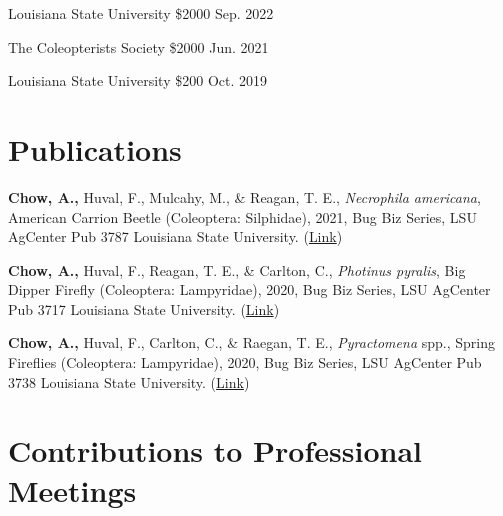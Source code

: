 \documentclass{article}
\newcommand{\hindent}{\hangindent=10pt}
\begin{document}
{Louisiana State University}
{\$2000} 
{Sep. 2022} %

{The Coleopterists Society}
{\$2000} 
{Jun. 2021} %

{Louisiana State University} 
{\$200}
{Oct. 2019} %

\section{Publications}
\newcommand{\BugBiz}[5]{
    \noindent
    \hindent
    {#1} %
    {#2}, %
    {#3}, %
    Bug Biz Series, LSU AgCenter Pub 
    {#4}
    Louisiana State University.
    (\href{#5}{Link}) %
}

\BugBiz{\textbf{\textbf{Chow, A.,}} Huval, F., Mulcahy, M., \& Reagan, T. E.,}
{\textit{Necrophila americana}, American Carrion Beetle (Coleoptera: Silphidae)}
{2021}
{3787}
{https://www.lsuagcenter.com/articles/page1619566292701}

\BugBiz{\textbf{\textbf{Chow, A.,}} Huval, F., Reagan, T. E., \& Carlton, C.,}
{\textit{Photinus pyralis}, Big Dipper Firefly (Coleoptera: Lampyridae)}
{2020}
{3717}
{https://www.lsuagcenter.com/profiles/bneely/articles/page1587050468972}

\BugBiz{\textbf{\textbf{Chow, A.,}} Huval, F., Carlton, C., \& Raegan, T. E.,} 
{\textit{Pyractomena} spp., Spring Fireflies (Coleoptera: Lampyridae)}
{2020}
{3738}
{https://www.lsuagcenter.com/profiles/bneely/articles/page1590080943471}

\section{Contributions to Professional Meetings}
\newcommand{\presentation}[6]{
    \noindent
    \hindent
    \small
    {#1} %
    {#2}, %
    {#3}, %
    {#5}, %
    {#4}. %
    (\href{#6}{Link}) %
    \normalsize \par
}
\end{document}
